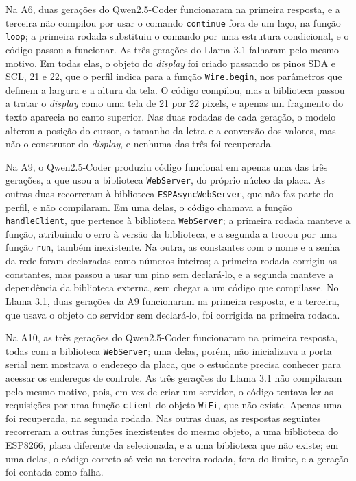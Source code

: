 Na A6, duas gerações do Qwen2.5-Coder funcionaram na primeira resposta, e a terceira não compilou por usar o comando \texttt{continue} fora de um laço, na função \texttt{loop}; a primeira rodada substituiu o comando por uma estrutura condicional, e o código passou a funcionar. As três gerações do Llama 3.1 falharam pelo mesmo motivo. Em todas elas, o objeto do \textit{display} foi criado passando os pinos SDA e SCL, 21 e 22, que o perfil indica para a função \texttt{Wire.begin}, nos parâmetros que definem a largura e a altura da tela. O código compilou, mas a biblioteca passou a tratar o \textit{display} como uma tela de 21 por 22 pixels, e apenas um fragmento do texto aparecia no canto superior. Nas duas rodadas de cada geração, o modelo alterou a posição do cursor, o tamanho da letra e a conversão dos valores, mas não o construtor do \textit{display}, e nenhuma das três foi recuperada.

Na A9, o Qwen2.5-Coder produziu código funcional em apenas uma das três gerações, a que usou a biblioteca \texttt{WebServer}, do próprio núcleo da placa. As outras duas recorreram à biblioteca \texttt{ESPAsyncWebServer}, que não faz parte do perfil, e não compilaram. Em uma delas, o código chamava a função \texttt{handleClient}, que pertence à biblioteca \texttt{WebServer}; a primeira rodada manteve a função, atribuindo o erro à versão da biblioteca, e a segunda a trocou por uma função \texttt{run}, também inexistente. Na outra, as constantes com o nome e a senha da rede foram declaradas como números inteiros; a primeira rodada corrigiu as constantes, mas passou a usar um pino sem declará-lo, e a segunda manteve a dependência da biblioteca externa, sem chegar a um código que compilasse. No Llama 3.1, duas gerações da A9 funcionaram na primeira resposta, e a terceira, que usava o objeto do servidor sem declará-lo, foi corrigida na primeira rodada.

Na A10, as três gerações do Qwen2.5-Coder funcionaram na primeira resposta, todas com a biblioteca \texttt{WebServer}; uma delas, porém, não inicializava a porta serial nem mostrava o endereço da placa, que o estudante precisa conhecer para acessar os endereços de controle. As três gerações do Llama 3.1 não compilaram pelo mesmo motivo, pois, em vez de criar um servidor, o código tentava ler as requisições por uma função \texttt{client} do objeto \texttt{WiFi}, que não existe. Apenas uma foi recuperada, na segunda rodada. Nas outras duas, as respostas seguintes recorreram a outras funções inexistentes do mesmo objeto, a uma biblioteca do ESP8266, placa diferente da selecionada, e a uma biblioteca que não existe; em uma delas, o código correto só veio na terceira rodada, fora do limite, e a geração foi contada como falha.

